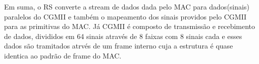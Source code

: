 \documentclass[a4paper,12pt]{article}
\begin{document}
Em suma, o RS converte a stream de dados dada pelo MAC para dados(sinais) paralelos do CGMII e também o mapeamento dos sinais providos pelo CGMII para as primitivas do MAC. Já CGMII é composto de transmissão e recebimento de dados, divididos em 64 sinais através de 8 faixas com 8 sinais cada e esses dados são tramitados atrvés de um frame interno cuja a estrutura é quase identica ao padrão de frame do MAC.
\end{document}
